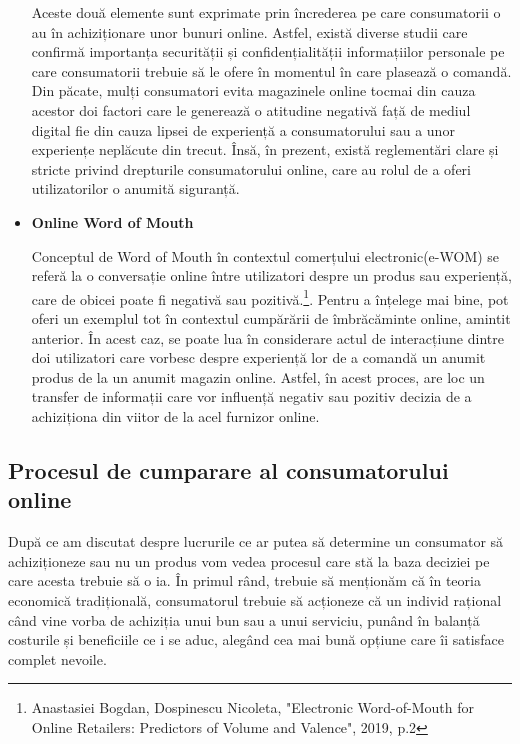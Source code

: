 \documentclass[a4paper, 12pt]{article}
\begin{document}
\begin{itemize}
		\quad Aceste două elemente sunt exprimate prin încrederea pe care consumatorii o au în achiziționare unor bunuri online. Astfel, există diverse studii care confirmă importanța securității și confidențialității informațiilor personale pe care consumatorii trebuie să le ofere în momentul în care plasează o comandă. Din păcate, mulți consumatori evita magazinele online tocmai din cauza acestor doi factori care le generează o atitudine negativă față de mediul digital fie din cauza lipsei de experiență a consumatorului sau a unor experiențe neplăcute din trecut. Însă, în prezent, există reglementări clare și stricte privind drepturile consumatorului online, care au rolul de a oferi utilizatorilor o anumită siguranță.
\newpage
		\item\textbf{Online Word of Mouth} 
		
		\quad Conceptul de Word of Mouth în contextul comerțului electronic(e-WOM) se referă la o conversație online între utilizatori despre un produs sau experiență, care de obicei poate fi negativă sau pozitivă.\footnote{Anastasiei Bogdan, Dospinescu Nicoleta, "Electronic Word-of-Mouth for Online Retailers:
			Predictors of Volume and Valence", 2019, p.2}. Pentru a înțelege mai bine, pot oferi un exemplul tot în contextul cumpărării de îmbrăcăminte online, amintit anterior. În acest caz, se poate lua în considerare actul de interacțiune dintre doi utilizatori care vorbesc despre experiență lor de a comandă un anumit produs de la un anumit magazin online. Astfel, în acest proces, are loc un transfer de informații care vor influență negativ sau pozitiv decizia de a achiziționa din viitor de la acel furnizor online.
		
	\end{itemize}

		\subsection{Procesul de cumparare al consumatorului online}
		\quad\quad După ce am discutat despre lucrurile ce ar putea să determine un consumator să achiziționeze sau nu un produs vom vedea procesul care stă la baza deciziei pe care acesta trebuie să o ia. În primul rând, trebuie să menționăm că în teoria economică tradițională, consumatorul trebuie să acționeze că un individ rațional când vine vorba de achiziția unui bun sau a unui serviciu, punând în balanță costurile și beneficiile ce i se aduc, alegând cea mai bună opțiune care îi satisface complet nevoile.
		
\end{document}
